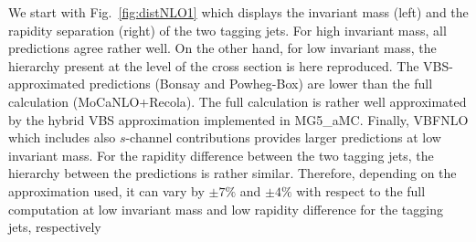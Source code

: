 \documentclass[twocolumn,epjc3]{svjour3} %
\begin{document}
    We start with Fig.~\ref{fig:distNLO1} which displays the invariant mass (left) and the rapidity separation (right) of the two tagging jets.
    For high invariant mass, all predictions agree rather well.
    On the other hand, for low invariant mass, the hierarchy present at the level of the cross section is here reproduced.
    The VBS-approximated predictions ({\sc Bonsay} and {\sc Powheg-Box}) are lower than the full calculation ({\sc MoCaNLO}+{\sc Recola}).
    The full calculation is rather well approximated by the hybrid VBS approximation implemented in {\sc MG5\_aMC}.
    Finally, {\sc VBFNLO} which includes also $s$-channel contributions provides larger predictions at low invariant mass.
    For the rapidity difference between the two tagging jets, the hierarchy between the predictions is rather similar.
    Therefore, depending on the approximation used, it can vary by $\pm7\%$ and $\pm4\%$ with respect to the full computation at low invariant mass and low rapidity difference for the tagging jets, respectively
\end{document}
